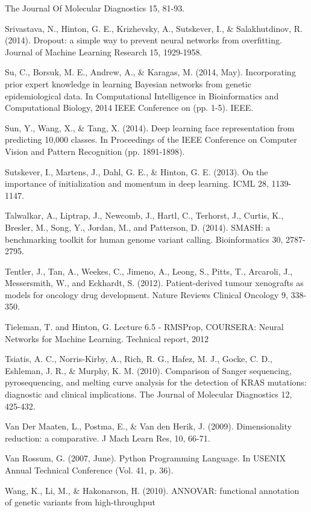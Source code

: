 \documentclass{article}
\begin{document}
\begin{list}{}{%
\setlength{\topsep}{0pt}%
\setlength{\leftmargin}{0.5in}%
\setlength{\listparindent}{-0.5in}%
\setlength{\itemindent}{-0.5in}%
\setlength{\parsep}{\parskip}%
}
The Journal Of Molecular Diagnostics 15, 81-93.\\\item[] Srivastava, N., Hinton, G. E., Krizhevsky, A., Sutskever, I., \& Salakhutdinov, R. (2014). Dropout: a simple way to prevent neural networks from overfitting. Journal of Machine Learning Research 15, 1929-1958.\\\item[] Su, C., Borsuk, M. E., Andrew, A., \& Karagas, M. (2014, May). Incorporating prior expert knowledge in learning Bayesian networks from genetic epidemiological data. In Computational Intelligence in Bioinformatics and Computational Biology, 2014 IEEE Conference on (pp. 1-5). IEEE.\\\item[] Sun, Y., Wang, X., \& Tang, X. (2014). Deep learning face representation from predicting 10,000 classes. In Proceedings of the IEEE Conference on Computer Vision and Pattern Recognition (pp. 1891-1898).\\\item[] Sutskever, I., Martens, J., Dahl, G. E., \& Hinton, G. E. (2013). On the importance of initialization and momentum in deep learning. ICML 28, 1139-1147.\\\item[] Talwalkar, A., Liptrap, J., Newcomb, J., Hartl, C., Terhorst, J., Curtis, K., Bresler, M., Song, Y., Jordan, M., and Patterson, D. (2014). SMASH: a benchmarking toolkit for human genome variant calling. Bioinformatics 30, 2787-2795.\\\item[] Tentler, J., Tan, A., Weekes, C., Jimeno, A., Leong, S., Pitts, T., Arcaroli, J., Messersmith, W., and Eckhardt, S. (2012). Patient-derived tumour xenografts as models for oncology drug development. Nature Reviews Clinical Oncology 9, 338-350.\\\item[] Tieleman, T. and Hinton, G. Lecture 6.5 - RMSProp, COURSERA: Neural Networks for Machine Learning. Technical report, 2012\\\item[] Tsiatis, A. C., Norris-Kirby, A., Rich, R. G., Hafez, M. J., Gocke, C. D., Eshleman, J. R., \& Murphy, K. M. (2010). Comparison of Sanger sequencing, pyrosequencing, and melting curve analysis for the detection of KRAS mutations: diagnostic and clinical implications. The Journal of Molecular Diagnostics 12, 425-432.\\\item[] Van Der Maaten, L., Postma, E., \& Van den Herik, J. (2009). Dimensionality reduction: a comparative. J Mach Learn Res, 10, 66-71.\\\item[] Van Rossum, G. (2007, June). Python Programming Language. In USENIX Annual Technical Conference (Vol. 41, p. 36).\\\item[] Wang, K., Li, M., \& Hakonarson, H. (2010). ANNOVAR: functional annotation of genetic variants from high-throughput 
\end{list}
\end{document}
